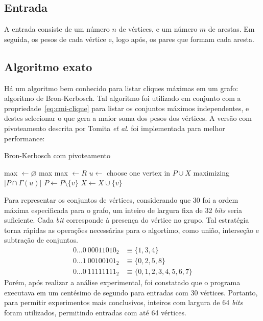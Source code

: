 \documentclass{article}
\begin{document}
\subsection{Entrada}
A entrada consiste de um número $n$ de vértices, e um número $m$ de arestas. Em seguida, os pesos de cada vértice e, logo após, os pares que formam cada aresta.

\subsection{Algoritmo exato}
Há um algoritmo bem conhecido para listar cliques máximas em um grafo: algoritmo de Bron-Kerbosch.\cite{Bron:1973:AFC:362342.362367} Tal algoritmo foi utilizado em conjunto com a propriedade~\eqref{eq:cmi-clique} para listar os conjuntos máximos \mbox{independentes}, e destes selecionar o que gera a maior soma dos pesos dos vértices. A versão com pivoteamento descrita por Tomita \textit{et al}.\cite{TOMITA200628} foi implementada para melhor performance:
\begin{algorithm}
  \caption{Bron-Kerbosch com pivoteamento}
  \begin{algorithmic}[1]
      \State max $\gets \varnothing$
      \State{} 
      \State\Return max
    \EndProcedure
    \vspace{5pt}
       
          \State max $\gets R$
        \EndIf
      \EndIf
      \vspace{3pt}
      \State $u \gets$ choose one vertex in $P \cup X$ maximizing $|P \cap \Gamma(u)|$ 
        \State{}
        \State $P \gets P \setminus \{v\}$
        \State $X \gets X \cup \{v\}$
      \EndFor
    \EndProcedure
  \end{algorithmic}
\end{algorithm}

Para representar os conjuntos de vértices, considerando que $30$ foi a ordem máxima especificada para o grafo, um inteiro de largura fixa de 32 \textit{bits} seria suficiente. Cada \textit{bit} corresponde à presença do vértice no grupo. Tal estratégia torna rápidas as operações necessárias para o algortimo, como união, interseção e subtração de conjuntos.
\begin{align*}
  0 \hdots 0 \> 00011010_2 &\equiv \{1, 3, 4\} \\
  0 \hdots 1 \> 00100101_2 &\equiv \{0, 2, 5, 8\} \\
  0 \hdots 0 \> 11111111_2 &\equiv \{0, 1, 2, 3, 4, 5, 6, 7\}
\end{align*}
Porém, após realizar a análise experimental, foi constatado que o programa executava em um centésimo de segundo para entradas com $30$ vértices. Portanto, para permitir experimentos mais conclusivos, inteiros com largura de 64 \textit{bits} foram utilizados, permitindo entradas com até 64 vértices.
\end{document}
